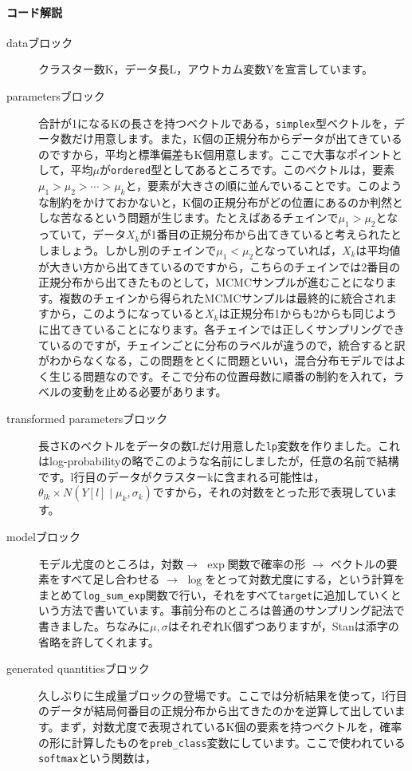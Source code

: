 \documentclass{ltjsbook}
\begin{document}
\paragraph{コード解説}
\begin{description}
	\item[dataブロック] クラスター数K，データ長L，アウトカム変数Yを宣言しています。
	\item[parametersブロック] 合計が1になるKの長さを持つベクトルである，\verb|simplex|型ベクトルを，データ数だけ用意します。また，K個の正規分布からデータが出てきているのですから，平均と標準偏差もK個用意します。ここで大事なポイントとして，平均$\mu$が\verb|ordered|型としてあるところです。このベクトルは，要素$\mu_1>\mu_2>\cdots>\mu_k$と，要素が大きさの順に並んでいることです。このような制約をかけておかないと，K個の正規分布がどの位置にあるのか判然としな苦なるという問題が生じます。たとえばあるチェインで$\mu_1>\mu_2$となっていて，データ$X_k$が1番目の正規分布から出てきていると考えられたとしましょう。しかし別のチェインで$\mu_1<\mu_2$となっていれば，$X_k$は平均値が大きい方から出てきているのですから，こちらのチェインでは2番目の正規分布から出てきたものとして，MCMCサンプルが進むことになります。複数のチェインから得られたMCMCサンプルは最終的に統合されますから，このようになっていると$X_k$は正規分布1からも2からも同じように出てきていることになります。各チェインでは正しくサンプリングできているのですが，チェインごとに分布のラベルが違うので，統合すると訳がわからなくなる，この問題をとくに問題といい，混合分布モデルではよく生じる問題なのです。そこで分布の位置母数に順番の制約を入れて，ラベルの変動を止める必要があります。
	\item[transformed parametersブロック] 長さKのベクトルをデータの数Lだけ用意した\verb|lp|変数を作りました。これはlog-probabilityの略でこのような名前にしましたが，任意の名前で結構です。l行目のデータがクラスターkに含まれる可能性は，$\theta_{lk} \times N(Y[l]\mid\mu_k,\sigma_k)$ですから，それの対数をとった形で表現しています。
	\item[modelブロック] モデル尤度のところは，対数$\to$ $\exp$関数で確率の形 $\to$ ベクトルの要素をすべて足し合わせる $\to$ $\log$をとって対数尤度にする，という計算をまとめて\verb|log_sum_exp|関数で行い，それをすべて\verb|target|に追加していくという方法で書いています。事前分布のところは普通のサンプリング記法で書きました。ちなみに$\mu,\sigma$はそれぞれK個ずつありますが，Stanは添字の省略を許してくれます。
	\item[generated quantitiesブロック] 久しぶりに生成量ブロックの登場です。ここでは分析結果を使って，l行目のデータが結局何番目の正規分布から出てきたのかを逆算して出しています。まず，対数尤度で表現されているK個の要素を持つベクトルを，確率の形に計算したものを\verb|preb_class|変数にしています。ここで使われている\verb|softmax|という関数は，

\end{description}
\end{document}
